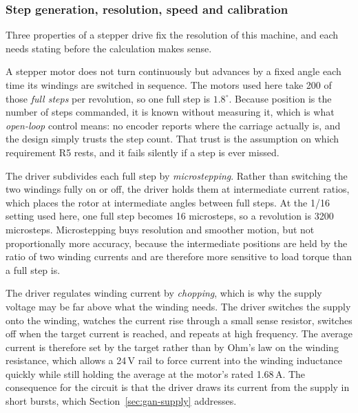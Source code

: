 \subsubsection{Step generation, resolution, speed and calibration}
\label{sec:gan-res}
\label{sec:gan-timing}

Three properties of a stepper drive fix the resolution of this machine, and each needs stating before the calculation makes sense.

A stepper motor does not turn continuously but advances by a fixed angle each time its windings are switched in sequence. The motors used here take 200 of those \emph{full steps} per revolution, so one full step is $1.8^\circ$. Because position is the number of steps commanded, it is known without measuring it, which is what \emph{open-loop} control means: no encoder reports where the carriage actually is, and the design simply trusts the step count. That trust is the assumption on which requirement R5 rests, and it fails silently if a step is ever missed.

The driver subdivides each full step by \emph{microstepping}. Rather than switching the two windings fully on or off, the driver holds them at intermediate current ratios, which places the rotor at intermediate angles between full steps. At the 1/16 setting used here, one full step becomes 16 microsteps, so a revolution is 3200 microsteps. Microstepping buys resolution and smoother motion, but not proportionally more accuracy, because the intermediate positions are held by the ratio of two winding currents and are therefore more sensitive to load torque than a full step is.

The driver regulates winding current by \emph{chopping}, which is why the supply voltage may be far above what the winding needs. The driver switches the supply onto the winding, watches the current rise through a small sense resistor, switches off when the target current is reached, and repeats at high frequency. The average current is therefore set by the target rather than by Ohm's law on the winding resistance, which allows a 24\,V rail to force current into the winding inductance quickly while still holding the average at the motor's rated 1.68\,A. The consequence for the circuit is that the driver draws its current from the supply in short bursts, which Section~\ref{sec:gan-supply} addresses.

